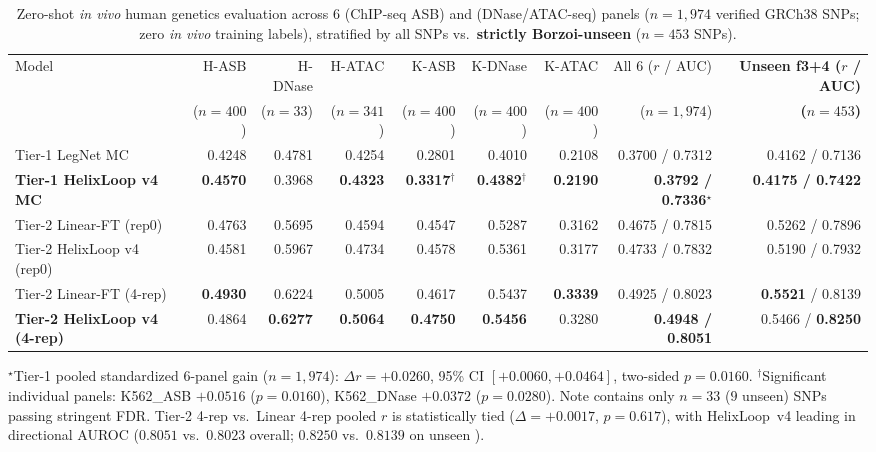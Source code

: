 \documentclass[10.5pt,a4paper]{article}
\begin{document}
\begin{table}[tb]
\scriptsize\setlength{\tabcolsep}{3.0pt}
\caption{Zero-shot \emph{in vivo} human genetics evaluation across 6  (ChIP-seq ASB) and  (DNase/ATAC-seq) panels ($n=1{,}974$ verified GRCh38 SNPs; zero \emph{in vivo} training labels), stratified by all SNPs vs.\ \textbf{strictly Borzoi-unseen } ($n=453$ SNPs).}\label{tab:invivo}
\begin{tabular}{@{}L{34mm}rrrrrrrr@{}}
\toprule
Model & H-ASB & H-DNase & H-ATAC & K-ASB & K-DNase & K-ATAC & All 6 ($r$ / AUC) & \textbf{Unseen f3+4 ($r$ / AUC)} \\
 & ($n=400$) & ($n=33$) & ($n=341$) & ($n=400$) & ($n=400$) & ($n=400$) & ($n=1{,}974$) & \textbf{($n=453$)} \\
\midrule
Tier-1 LegNet MC & 0.4248 & 0.4781 & 0.4254 & 0.2801 & 0.4010 & 0.2108 & 0.3700 / 0.7312 & 0.4162 / 0.7136 \\
\textbf{Tier-1 HelixLoop v4 MC} & \textbf{0.4570} & 0.3968 & \textbf{0.4323} & \textbf{0.3317}$^\dagger$ & \textbf{0.4382}$^\dagger$ & \textbf{0.2190} & \textbf{0.3792 / 0.7336}$^\star$ & \textbf{0.4175 / 0.7422} \\
\midrule
Tier-2 Linear-FT (rep0) & 0.4763 & 0.5695 & 0.4594 & 0.4547 & 0.5287 & 0.3162 & 0.4675 / 0.7815 & 0.5262 / 0.7896 \\
Tier-2 HelixLoop v4 (rep0) & 0.4581 & 0.5967 & 0.4734 & 0.4578 & 0.5361 & 0.3177 & 0.4733 / 0.7832 & 0.5190 / 0.7932 \\
Tier-2 Linear-FT (4-rep) & \textbf{0.4930} & 0.6224 & 0.5005 & 0.4617 & 0.5437 & \textbf{0.3339} & 0.4925 / 0.8023 & \textbf{0.5521} / 0.8139 \\
\textbf{Tier-2 HelixLoop v4 (4-rep)} & 0.4864 & \textbf{0.6277} & \textbf{0.5064} & \textbf{0.4750} & \textbf{0.5456} & 0.3280 & \textbf{0.4948 / 0.8051} & 0.5466 / \textbf{0.8250} \\
\bottomrule
\end{tabular}
\vspace{2pt}
{\scriptsize $^\star$Tier-1 pooled standardized 6-panel gain ($n=1{,}974$): $\Delta r=+0.0260$, 95\% CI $[+0.0060,+0.0464]$, two-sided $p=0.0160$. $^\dagger$Significant individual panels: K562\_ASB $+0.0516$ ($p=0.0160$), K562\_DNase $+0.0372$ ($p=0.0280$). Note  contains only $n=33$ ($9$ unseen) SNPs passing stringent FDR. Tier-2 4-rep vs.\ Linear 4-rep pooled $r$ is statistically tied ($\Delta=+0.0017$, $p=0.617$), with HelixLoop~v4 leading in directional AUROC ($0.8051$ vs.\ $0.8023$ overall; $0.8250$ vs.\ $0.8139$ on unseen ).}
\end{table}
\end{document}
